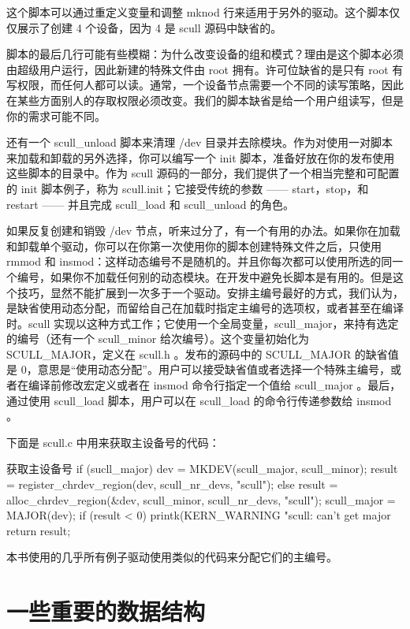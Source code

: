 \documentclass[lang=cn,newtx,10pt,scheme=chinese]{elegantbook}
\begin{document}
这个脚本可以通过重定义变量和调整 mknod 行来适用于另外的驱动。这个脚本仅仅展示了创建 4 个设备，因为 4 是 scull 源码中缺省的。

脚本的最后几行可能有些模糊：为什么改变设备的组和模式？理由是这个脚本必须由超级用户运行，因此新建的特殊文件由 root 拥有。许可位缺省的是只有 root 有写权限，而任何人都可以读。通常，一个设备节点需要一个不同的读写策略，因此在某些方面别人的存取权限必须改变。我们的脚本缺省是给一个用户组读写，但是你的需求可能不同。

还有一个 scull\_unload 脚本来清理 /dev 目录并去除模块。作为对使用一对脚本来加载和卸载的另外选择，你可以编写一个 init 脚本，准备好放在你的发布使用这些脚本的目录中。作为 scull 源码的一部分，我们提供了一个相当完整和可配置的 init 脚本例子，称为 scull.init；它接受传统的参数 —— start，stop，和 restart —— 并且完成 scull\_load 和 scull\_unload
的角色。

如果反复创建和销毁 /dev 节点，听来过分了，有一个有用的办法。如果你在加载和卸载单个驱动，你可以在你第一次使用你的脚本创建特殊文件之后，只使用 rmmod 和 insmod：这样动态编号不是随机的。并且你每次都可以使用所选的同一个编号，如果你不加载任何别的动态模块。在开发中避免长脚本是有用的。但是这个技巧，显然不能扩展到一次多于一个驱动。安排主编号最好的方式，我们认为，是缺省使用动态分配，而留给自己在加载时指定主编号的选项权，或者甚至在编译时。scull 实现以这种方式工作；它使用一个全局变量，scull\_major，来持有选定的编号（还有一个 scull\_minor 给次编号）。这个变量初始化为 SCULL\_MAJOR，定义在 scull.h 。发布的源码中的 SCULL\_MAJOR 的缺省值是 0，意思是``使用动态分配''。用户可以接受缺省值或者选择一个特殊主编号，或者在编译前修改宏定义或者在 insmod 命令行指定一个值给 scull\_major 。最后，通过使用 scull\_load 脚本，用户可以在 scull\_load 的命令行传递参数给 insmod 。

下面是 scull.c 中用来获取主设备号的代码：

\begin{mycode}{获取主设备号}
if (sucll_major) {
    dev = MKDEV(scull_major, scull_minor);
    result = register_chrdev_region(dev, scull_nr_devs, "scull");
} else {
    result = alloc_chrdev_region(&dev, scull_minor, scull_nr_devs, "scull");
    scull_major = MAJOR(dev);
}
if (result < 0) {
    printk(KERN_WARNING "scull: can't get major %
    return result;
}
\end{mycode}

本书使用的几乎所有例子驱动使用类似的代码来分配它们的主编号。

\section{一些重要的数据结构}
\end{document}
